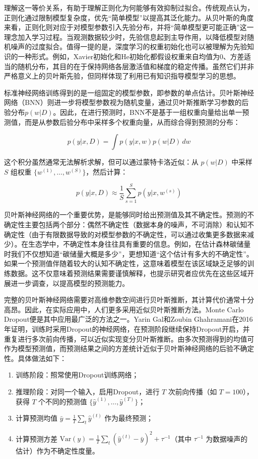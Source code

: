 \documentclass[
  twoside,12pt,fontset=none]{ctexbook}
\providecommand{\tightlist}{%
  \setlength{\itemsep}{0pt}\setlength{\parskip}{0pt}}
\begin{document}
理解这一等价关系，有助于理解正则化为何能够有效抑制过拟合。传统观点认为，正则化通过限制模型复杂度，优先``简单模型''以提高其泛化能力。从贝叶斯的角度来看，正则化则对应于对模型参数引入先验分布，并将``简单模型更可能正确''这一理念加入学习过程。当观测数据较少时，先验信息起到主导作用，以降低模型对随机噪声的过度拟合。值得一提的是，深度学习的权重初始化也可以被理解为先验知识的一种形式。例如，Xavier初始化和He初始化都假设权重来自均值为0、方差适当的随机分布，其目的在于保持网络各层激活值和梯度的稳定传播。虽然它们并非严格意义上的贝叶斯先验，但同样体现了利用已有知识指导模型学习的思想。

标准神经网络训练得到的是一组固定的模型参数，即参数的单点估计。贝叶斯神经网络（BNN）则进一步将模型参数视为随机变量，通过贝叶斯推断学习参数的后验分布\(p(w|D)\)。因此，在进行预测时，BNN不是基于一组权重向量给出单一预测值，而是从参数后验分布中采样多个权重向量，从而综合得到预测的分布：

\[p(y|x, D) = \int p(y|x, w) p(w|D) \, dw\]

这个积分虽然通常无法解析求解，但可以通过蒙特卡洛近似：从 \(p(w|D)\) 中采样 \(S\) 组权重 \(\{w^{(1)}, \ldots, w^{(S)}\}\)，然后计算：

\[p(y|x, D) \approx \frac{1}{S} \sum_{s=1}^{S} p(y|x, w^{(s)})\]

贝叶斯神经网络的一个重要优势，是能够同时给出预测值及其不确定性。预测的不确定性主要包括两个部分：偶然不确定性（数据本身的噪声，不可消除）和认知不确定性（由于有限数据导致的对模型参数的不确定性，可以通过收集更多数据来减少）。在生态学中，不确定性本身往往具有重要的信息。例如，在估计森林碳储量时我们不仅想知道``碳储量大概是多少''，更想知道``这个估计有多大的不确定性''。如果一个预测值伴随着较大的认知不确定性，这意味着模型在该区域缺乏足够的训练数据。这不仅意味着预测结果需要谨慎解释，也提示研究者应优先在这些区域开展进一步调查，以提高模型的预测能力。

完整的贝叶斯神经网络需要对高维参数空间进行贝叶斯推断，其计算代价通常十分高昂。因此，在实际应用中，人们更多采用近似贝叶斯推断方法。Monte Carlo Dropout便是其中应用最广泛的方法之一。Yarin Gal和Zoubin Ghahramani在2016年证明，训练时采用Dropout的神经网络，在预测阶段继续保持Dropout开启，并重复进行多次前向传播，可以近似实现变分贝叶斯推断。由多次预测得到的均值可作为模型预测值，而预测结果之间的方差统计近似于贝叶斯神经网络的后验不确定性。具体做法如下：

\begin{enumerate}
\def\labelenumi{\arabic{enumi}.}
\tightlist
\item
  训练阶段：照常使用Dropout训练网络；
\item
  推理阶段：对同一个输入，启用Dropout，进行 \(T\) 次前向传播（如 \(T=100\)），获得 \(T\) 个不同的预测值 \(\{\hat{y}^{(1)}, \ldots, \hat{y}^{(T)}\}\)；
\item
  计算预测均值 \(\bar{y} = \frac{1}{T}\sum_t \hat{y}^{(t)}\) 作为最终预测；
\item
  计算预测方差 \(\text{Var}(y) = \frac{1}{T}\sum_t (\hat{y}^{(t)} - \bar{y})^2 + \tau^{-1}\)（其中 \(\tau^{-1}\) 为数据噪声的估计）作为不确定性度量。
\end{enumerate}
\end{document}
